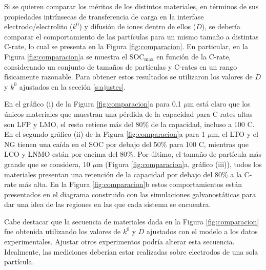 Si se quieren comparar los méritos de los distintos materiales, en términos de 
sus propiedades intrínsecas de transferencia de carga en la interfase 
electrodo/electrolito ($k^0$) y difusión de iones dentro de ellos ($D$), se 
debería comparar el comportamiento de las partículas para un mismo tamaño a 
distintas C-rate, lo cual se presenta en la Figura \ref{fig:comparacion}. En 
particular, en la Figura \ref{fig:comparacion}a se muestra el SOC$_{\max}$ 
en función de la C-rate, considerando un conjunto de tamaños de partículas y 
C-rates en un rango físicamente razonable. Para obtener estos resultados se 
utilizaron los valores de $D$ y $k^0$ ajustados en la sección \ref{s:ajustes}.

En el gráfico (i) de la Figura \ref{fig:comparacion}a para 0.1 $\mu$m está
claro que los únicos materiales que muestran una pérdida de la capacidad para
C-rates altas son LFP y LMO, el resto retiene más del 80\% de la capacidad, 
incluso a 100 C. En el segundo gráfico (ii) de la Figura
\ref{fig:comparacion}a para 1 $\mu$m, el LTO y el NG tienen
una caída en el SOC por debajo del 50\% para 100 C, mientras que LCO y LNMO
están por encima del 80\%. Por último, el tamaño de partícula más grande que se 
considera, 10 $\mu$m (Figura \ref{fig:comparacion}a, gráfico (iii)), 
todos los materiales presentan una retención de la capacidad por debajo del 80\%
a la C-rate más alta. En la Figura \ref{fig:comparacion}b estos 
comportamientos están presentados en el diagrama construido con las simulaciones
galvanostáticas para dar una idea de las regiones en las que cada sistema se
encuentra. 

Cabe destacar que la secuencia de materiales dada en la Figura 
\ref{fig:comparacion} fue obtenida utilizando los valores de $k^0$ y $D$ 
ajustados con el modelo a los datos experimentales. Ajustar otros experimentos
podría alterar esta secuencia. Idealmente, las mediciones deberían estar 
realizadas sobre electrodos de una sola partícula.
